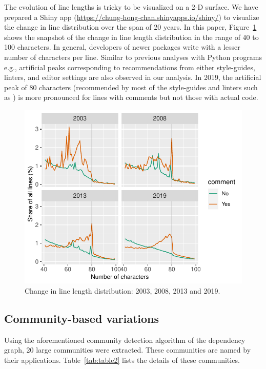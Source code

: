 The evolution of line lengths is tricky to be visualized on a 2-D surface. We have prepared a Shiny app (\url{https://chung-hong-chan.shinyapps.io/shiny/}) to visualize the change in line distribution over the span of 20 years. In this paper, Figure~\ref{figure:fig3} shows the snapshot of the change in line length distribution in the range of 40 to 100 characters. In general, developers of newer packages write with a lesser number of characters per line. Similar to previous analyses with Python programs e.g.\citet{vanderplas}, artificial peaks corresponding to recommendations from either style-guides, linters, and editor settings are also observed in our analysis. In 2019, the artificial peak of 80 characters (recommended by most of the style-guides and linters such as ) is more pronounced for lines with comments but not those with actual code.

\begin{figure}[htbp]
  \centering
  \includegraphics{fig3}
  \caption{Change in line length distribution: 2003, 2008, 2013 and 2019.}
  \label{figure:fig3}
\end{figure}


\subsection{Community-based variations}

Using the aforementioned community detection algorithm of the dependency graph, 20 large communities were extracted. These communities are named by their applications. Table~\ref{tab:table2} lists the details of these communities.

